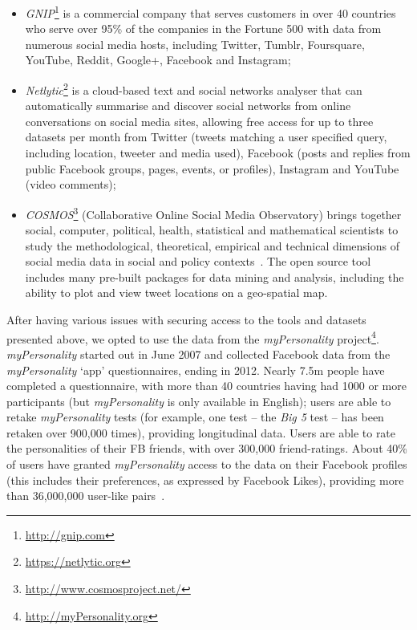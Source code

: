 \documentclass[conference]{IEEEtran}
\begin{document}
\begin{itemize}
\item {\emph{GNIP}}\footnote{\url{http://gnip.com}} is a commercial company
that serves customers in over 40 countries who serve over 95\% of the
companies in the Fortune 500 with data from numerous social media
hosts, including Twitter, Tumblr, Foursquare, YouTube, Reddit,
Google+, Facebook and Instagram;
\item {\emph{Netlytic}}\footnote{\url{https://netlytic.org}} is a cloud-based
text and social networks analyser that can automatically summarise and
discover social networks from online conversations on social media
sites, allowing free access for up to three datasets per month from
Twitter (tweets matching a user specified query, including location,
tweeter and media used), Facebook (posts and replies from public
Facebook groups, pages, events, or profiles), Instagram and YouTube
(video comments);
\item {\emph{COSMOS}}\footnote{\url{http://www.cosmosproject.net/}}
(Collaborative Online Social Media Observatory) brings
together social, computer, political, health, statistical and
mathematical scientists to study the methodological, theoretical,
empirical and technical dimensions of social media data in social and
policy contexts~\cite{burnap-et-al:2015}. The open source tool
includes many pre-built packages for data mining and analysis,
including the ability to plot and view tweet locations on a
geo-spatial map.
\end{itemize}

After having various issues with securing access to the tools and
datasets presented above, we opted to use the data from the
{\emph{myPersonality}}
project\footnote{\url{http://myPersonality.org}}. {\emph{myPersonality}}
started out in June 2007 and collected Facebook data from the
{\emph{myPersonality}} `app' questionnaires, ending in 2012. Nearly
7.5m people have completed a questionnaire, with more than 40
countries having had 1000 or more participants (but
{\emph{myPersonality}} is only available in English); users are able
to retake {\emph{myPersonality}} tests (for example, one test -- the
{\emph{Big 5}} test -- has been retaken over 900,000 times), providing
longitudinal data. Users are able to rate the personalities of their
FB friends, with over 300,000 friend-ratings. About 40\% of users have
granted {\emph{myPersonality}} access to the data on their Facebook
profiles (this includes their preferences, as expressed by Facebook
Likes), providing more than 36,000,000 user-like
pairs~\cite{kosinski-et-al:2013}.
\end{document}
